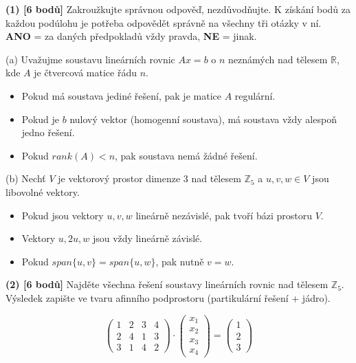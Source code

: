 \documentclass[a4paper,11pt]{article}
\begin{document}
\newpage

\noindent
\textbf{(1) [6 bodů]} Zakroužkujte správnou odpověď, nezdůvodňujte. K získání bodů za každou podúlohu je potřeba odpovědět správně na všechny tři otázky v ní. \\
\textbf{ANO} = za daných předpokladů vždy pravda, \textbf{NE} = jinak.

\vspace{3mm}

\noindent
(a) Uvažujme soustavu lineárních rovnic $Ax=b$ o $n$ neznámých nad tělesem $\mathbb{R}$, kde $A$ je čtvercová matice řádu $n$.
\begin{itemize}
    \item[\textbf{ANO / NE}] Pokud má soustava jediné řešení, pak je matice $A$ regulární.
    \item[\textbf{ANO / NE}] Pokud je $b$ nulový vektor (homogenní soustava), má soustava vždy alespoň jedno řešení.
    \item[\textbf{ANO / NE}] Pokud $rank(A) < n$, pak soustava nemá žádné řešení.
\end{itemize}

\vspace{3mm}

\noindent
(b) Nechť $V$ je vektorový prostor dimenze 3 nad tělesem $\mathbb{Z}_5$ a $u, v, w \in V$ jsou libovolné vektory.
\begin{itemize}
    \item[\textbf{ANO / NE}] Pokud jsou vektory $u, v, w$ lineárně nezávislé, pak tvoří bázi prostoru $V$.
    \item[\textbf{ANO / NE}] Vektory $u, 2u, w$ jsou vždy lineárně závislé.
    \item[\textbf{ANO / NE}] Pokud $span\{u, v\} = span\{u, w\}$, pak nutně $v = w$.
\end{itemize}

\vspace{1cm}

\noindent
\textbf{(2) [6 bodů]} Najděte všechna řešení soustavy lineárních rovnic nad tělesem $\mathbb{Z}_5$. Výsledek zapište ve tvaru afinního podprostoru (partikulární řešení + jádro).

$$
\left( \begin{matrix}
1 & 2 & 3 & 4 \\
2 & 4 & 1 & 3 \\
3 & 1 & 4 & 2
\end{matrix} \right)
\cdot
\left( \begin{matrix}
x_1 \\ x_2 \\ x_3 \\ x_4
\end{matrix} \right)
=
\left( \begin{matrix}
1 \\ 2 \\ 3
\end{matrix} \right)
$$
\end{document}
